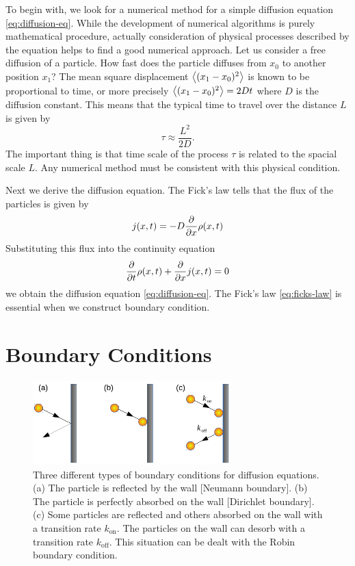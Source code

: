 To begin with, we look for a numerical method for a simple diffusion equation \eqref{eq:diffusion-eq}.  While the development of numerical algorithms is purely mathematical procedure, actually consideration of physical processes described by the equation helps to find a good numerical approach.   Let us consider a free diffusion of a particle.  How fast does the particle diffuses from $x_0$ to another position $x_1$?  The mean square displacement $\expval{(x_1-x_0)^2}$ is known to be proportional to time, or more precisely $\expval{(x_1-x_0)^2}=2D t$ where $D$ is the diffusion constant.   This means that the typical time to travel over the distance $L$ is given by 
\begin{equation}\label{eq:fast-passage-time}
	\tau \approx \displaystyle \frac{L^2}{2D}.
\end{equation}
The important thing is that time scale of the process $\tau$ is related to the spacial scale $L$.   Any numerical method must be consistent with this physical condition.

Next we derive the diffusion equation.  The Fick's law tells that the flux of the particles is given by
\begin{equation}\label{eq:ficks-law}
	j(x,t) = - D \pdv{x} \rho(x,t) 
\end{equation}
Substituting this flux into the continuity equation
\begin{equation}\label{eq:continuity-eq}
	\pdv{t} \rho(x,t) + \pdv{x} j(x,t) = 0
\end{equation}
we obtain the diffusion equation \eqref{eq:diffusion-eq}.   The Fick's law \eqref{eq:ficks-law} is essential when we construct boundary condition.


\section{Boundary Conditions}

\begin{figure}
\centering
\includegraphics[width=3in]{13.pde1/boundary_condition.pdf}
\caption{Three different types of boundary conditions for diffusion equations.  (a) The particle is reflected by the wall [Neumann boundary].  (b) The particle is perfectly absorbed on the wall [Dirichlet boundary].  (c) Some particles are reflected and others absorbed on the wall with a transition rate $k_\text{on}$.  The particles on the wall can desorb with a transition rate $k_\text{off}$.  This situation can be dealt with the Robin boundary condition.}
\label{fig:boundary_condition}
\end{figure}

